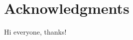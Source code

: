 
\begingroup
\let\clearpage\relax
\let\cleardoublepage\relax
\let\cleardoublepage\relax
\chapter*{Acknowledgments}
Hi everyone, thanks!


\endgroup